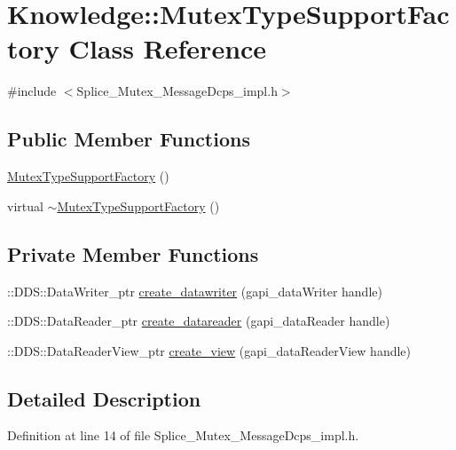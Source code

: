 \hypertarget{classKnowledge_1_1MutexTypeSupportFactory}{
\section{Knowledge::MutexTypeSupportFactory Class Reference}
\label{db/da1/classKnowledge_1_1MutexTypeSupportFactory}
}


{\ttfamily \#include $<$Splice\_\-Mutex\_\-MessageDcps\_\-impl.h$>$}

\subsection*{Public Member Functions}
\begin{DoxyCompactItemize}
\item 
\hyperlink{classKnowledge_1_1MutexTypeSupportFactory_a2a96c2feb5be492c906bbb3b4eb591f7}{MutexTypeSupportFactory} ()
\item 
virtual \hyperlink{classKnowledge_1_1MutexTypeSupportFactory_a878dd42f0241259a8a3dcabca06fe709}{$\sim$MutexTypeSupportFactory} ()
\end{DoxyCompactItemize}
\subsection*{Private Member Functions}
\begin{DoxyCompactItemize}
\item 
::DDS::DataWriter\_\-ptr \hyperlink{classKnowledge_1_1MutexTypeSupportFactory_a23a5985ac4186c09f43510e3e32fd609}{create\_\-datawriter} (gapi\_\-dataWriter handle)
\item 
::DDS::DataReader\_\-ptr \hyperlink{classKnowledge_1_1MutexTypeSupportFactory_a0f532947d28b1bdddd44f0d184b261b8}{create\_\-datareader} (gapi\_\-dataReader handle)
\item 
::DDS::DataReaderView\_\-ptr \hyperlink{classKnowledge_1_1MutexTypeSupportFactory_af222e5e4d4977604b2095b02e2d4f38d}{create\_\-view} (gapi\_\-dataReaderView handle)
\end{DoxyCompactItemize}


\subsection{Detailed Description}


Definition at line 14 of file Splice\_\-Mutex\_\-MessageDcps\_\-impl.h.



